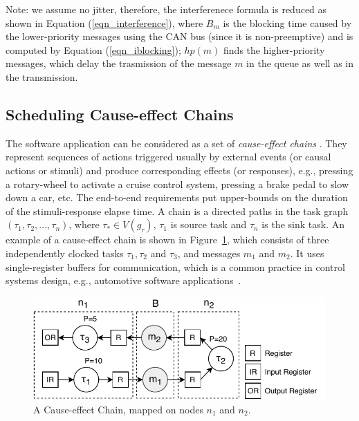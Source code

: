 {Note: we assume no jitter, therefore, the interferenece formula is reduced as shown in Equation (\ref{eqn_interference}), where $B_m$ is the blocking time caused by the lower-priority messages using the CAN bus (since it is non-preemptive) and is computed by Equation (\ref{eqn_iblocking}); $hp(m)$ finds the higher-priority messages, which delay the trasmission of the message $m$ in the queue as well as in the transmission.

\subsection{Scheduling Cause-effect Chains}\label{subsec_cause_effect_chains}
The software application can be considered as a set of \textit{cause-effect chains} \sexpsp{\Gamma}{\Gamma}. They represent sequences of actions triggered usually by external events (or causal actions or stimuli) and produce corresponding effects (or responses), e.g.,  pressing a rotary-wheel to activate a cruise control system, pressing a brake pedal to slow down a car, etc. The end-to-end requirements put upper-bounds on the duration of the stimuli-response elapse time. A chain is a directed paths in the task graph $(\tau_1,\tau_2,...,\tau_n)$,  where $\tau_*\in V(g_\tau)$, $\tau_1$ is source task and $\tau_n$ is the sink task. An example of a cause-effect chain is shown in  Figure~\ref{fig_causeeffectchainntk}, which consists of three independently clocked tasks $\tau_1,\tau_2$ and $\tau_3$, and messages $m_1$ and $m_2$. It uses single-register buffers for communication, which is a common practice in control systems design, e.g., automotive software applications~\cite{Becker2017End-to-endSystems}.
\begin{figure}
	\centering
	\includegraphics[width=0.7\linewidth]{img/cause_effect_chain_ntk}
	\caption{A Cause-effect Chain, mapped on nodes $n_1$ and $n_2$.}
	\label{fig_causeeffectchainntk}
\end{figure}

}
